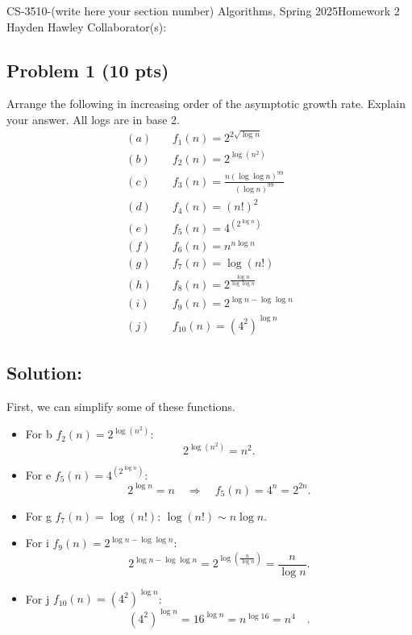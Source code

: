 \documentclass[12pt]{article}
\begin{document}
\noindent CS-3510-(write here your section number) Algorithms, Spring 2025\hfill Homework 2\\
Hayden Hawley \hfill Collaborator(s):

\hrulefill

\subsection*{Problem 1 (10 pts)}
Arrange the following in increasing order of the asymptotic growth rate. Explain your answer. All logs are in base 2.
\begin{align*}
    (a) \quad & f_1(n) = 2^{2\sqrt{\log n}} \\
    (b) \quad & f_2(n) = 2^{\log(n^2)} \\
    (c) \quad & f_3(n) = \frac{n (\log \log n)^{99}}{(\log n)^{99}} \\
    (d) \quad & f_4(n) = (n!)^2\\
    (e) \quad & f_5(n) = 4^{(2^{\log n})} \\
    (f) \quad & f_6(n) = n^{n \log n} \\
    (g) \quad & f_7(n) = \log(n!) \\
    (h) \quad & f_8(n) = 2^{\frac{\log n}{\log \log n}} \\
    (i) \quad & f_9(n) = 2^{\log n - \log \log n} \\
    (j) \quad & f_{10}(n) = (4^2)^{\log n}
\end{align*}

\subsection*{Solution:}
First, we can simplify some of these functions.

\begin{itemize}
    \item For b \(f_2(n)=2^{\log (n^2)}\):  
    \[
    2^{\log (n^2)} = n^2.
    \]
    
    \item For e \(f_5(n)=4^{(2^{\log n})}\):  
    \[
    2^{\log n} = n \quad \Longrightarrow \quad f_5(n)=4^n = 2^{2n}.
    \]
    
    \item For g \(f_7(n)=\log(n!)\):  \(\log(n!) \sim n\log n\).

    \item For i \(f_9(n)=2^{\log n-\log \log n}\):  
    \[
    2^{\log n-\log \log n} = 2^{\log\left(\frac{n}{\log n}\right)} = \frac{n}{\log n}.
    \]
    
    \item For j \(f_{10}(n)=(4^2)^{\log n}\):  
    \[
    (4^2)^{\log n} = 16^{\log n} = n^{\log 16} = n^4 \quad.
    \]
\end{itemize}
\end{document}
